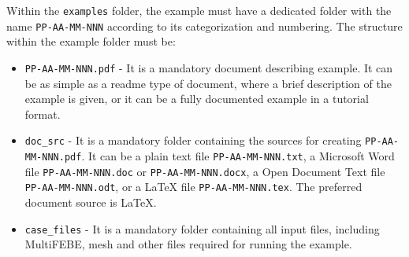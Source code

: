 \documentclass{article}
\begin{document}
Within the \texttt{examples} folder, the example must have a dedicated folder with the name \texttt{PP-AA-MM-NNN} according to its categorization and numbering. The structure within the example folder must be:
\begin{itemize}
    \item \texttt{PP-AA-MM-NNN.pdf} - It is a mandatory document describing example. It can be as simple as a readme type of document, where a brief description of the example is given, or it can be a fully documented example in a tutorial format.
    \item \texttt{doc\_src} - It is a mandatory folder containing the sources for creating \texttt{PP-AA-MM-NNN.pdf}. It can be a plain text file \texttt{PP-AA-MM-NNN.txt}, a Microsoft Word file \texttt{PP-AA-MM-NNN.doc} or \texttt{PP-AA-MM-NNN.docx}, a Open Document Text file \texttt{PP-AA-MM-NNN.odt}, or a LaTeX file \texttt{PP-AA-MM-NNN.tex}. The preferred document source is LaTeX.
    \item \texttt{case\_files} - It is a mandatory folder containing all input files, including MultiFEBE, mesh and other files required for running the example.
\end{itemize}
\end{document}
